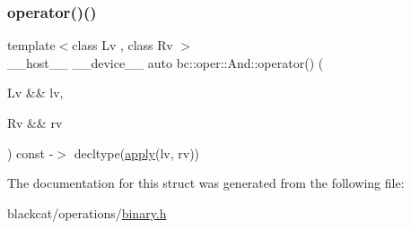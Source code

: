 \mbox{\label{structbc_1_1oper_1_1And_a0ee520ea8d55191ad9862d9b13bb5519}} 
\subsubsection{\texorpdfstring{operator()()}{operator()()}}
{\footnotesize\ttfamily template$<$class Lv , class Rv $>$ \\
\+\_\+\+\_\+host\+\_\+\+\_\+ \+\_\+\+\_\+device\+\_\+\+\_\+ auto bc\+::oper\+::\+And\+::operator() (\begin{DoxyParamCaption}\item[{Lv \&\&}]{lv,  }\item[{Rv \&\&}]{rv }\end{DoxyParamCaption}) const -\/$>$ decltype(\hyperlink{structbc_1_1oper_1_1And_a1766c036547f8a41b966b06b6decb812}{apply}(lv, rv)) \hspace{0.3cm}{\ttfamily [inline]}}



The documentation for this struct was generated from the following file\+:\begin{DoxyCompactItemize}
\item 
blackcat/operations/\hyperlink{binary_8h}{binary.\+h}\end{DoxyCompactItemize}
